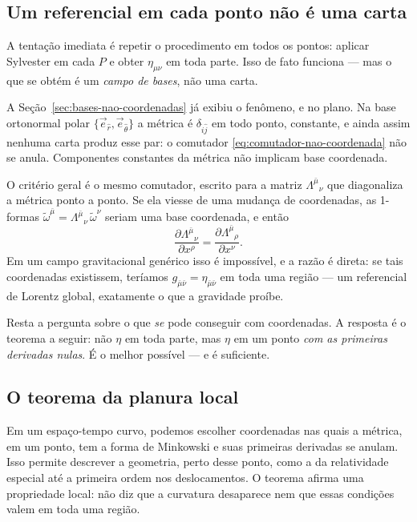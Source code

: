 \documentclass[12pt,a4paper,oneside]{book}
\theoremstyle{rgplain}
\theoremstyle{rgremark}
\begin{document}
\subsection*{Um referencial em cada ponto não é uma carta}

A tentação imediata é repetir o procedimento em todos os pontos: aplicar
Sylvester em cada $P$ e obter $\eta_{\mu\nu}$ em toda parte. Isso de fato
funciona --- mas o que se obtém é um \emph{campo de bases}, não uma carta.

A Seção~\ref{sec:bases-nao-coordenadas} já exibiu o fenômeno, e no plano. Na
base ortonormal polar $\{\vec e_{\hat r},\vec e_{\hat\theta}\}$ a métrica é
$\delta_{\hat i\hat j}$ em todo ponto, constante, e ainda assim nenhuma carta
produz esse par: o comutador \eqref{eq:comutador-nao-coordenada} não se anula.
Componentes constantes da métrica não implicam base coordenada.

O critério geral é o mesmo comutador, escrito para a matriz
$\Lambda^{\bar\mu}{}_\nu$ que diagonaliza a métrica ponto a ponto. Se ela
viesse de uma mudança de coordenadas, as 1-formas
$\tilde\omega^{\bar\mu}=\Lambda^{\bar\mu}{}_\nu\,\tilde\omega^\nu$ seriam uma
base coordenada, e então
\[
  \frac{\partial\Lambda^{\bar\mu}{}_\nu}{\partial x^\rho}
  =\frac{\partial\Lambda^{\bar\mu}{}_\rho}{\partial x^\nu} .
\]
Em um campo gravitacional genérico isso é impossível, e a razão é direta: se
tais coordenadas existissem, teríamos $g_{\bar\mu\bar\nu}=\eta_{\bar\mu\bar\nu}$
em toda uma região --- um referencial de Lorentz global, exatamente o que a
gravidade proíbe.

Resta a pergunta sobre o que \emph{se} pode conseguir com coordenadas. A
resposta é o teorema a seguir: não $\eta$ em toda parte, mas $\eta$ em um
ponto \emph{com as primeiras derivadas nulas}. É o melhor possível --- e é
suficiente.

\subsection*{O teorema da planura local}

Em um espaço-tempo curvo, podemos escolher coordenadas nas quais a métrica,
em um ponto, tem a forma de Minkowski e suas primeiras derivadas se anulam.
Isso permite descrever a geometria, perto desse ponto, como a da relatividade
especial até a primeira ordem nos deslocamentos. O teorema afirma uma
propriedade local: não diz que a curvatura desaparece nem que essas condições
valem em toda uma região.
\end{document}
